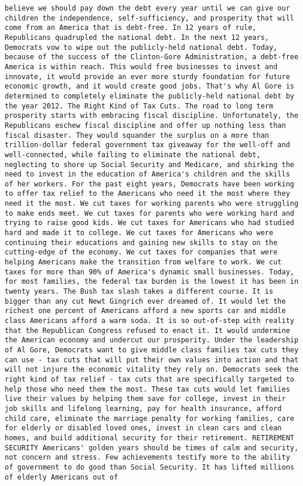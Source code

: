 \documentclass[
]{article}
\begin{document}
\begin{verbatim}
believe we should pay down the debt every year until we can give our children the independence, self-sufficiency, and prosperity that will come from an America that is debt-free. In 12 years of rule, Republicans quadrupled the national debt. In the next 12 years, Democrats vow to wipe out the publicly-held national debt. Today, because of the success of the Clinton-Gore Administration, a debt-free America is within reach. This would free businesses to invest and innovate, it would provide an ever more sturdy foundation for future economic growth, and it would create good jobs. That's why Al Gore is determined to completely eliminate the publicly-held national debt by the year 2012. The Right Kind of Tax Cuts. The road to long term prosperity starts with embracing fiscal discipline. Unfortunately, the Republicans eschew fiscal discipline and offer up nothing less than fiscal disaster. They would squander the surplus on a more than trillion-dollar federal government tax giveaway for the well-off and well-connected, while failing to eliminate the national debt, neglecting to shore up Social Security and Medicare, and shirking the need to invest in the education of America's children and the skills of her workers. For the past eight years, Democrats have been working to offer tax relief to the Americans who need it the most where they need it the most. We cut taxes for working parents who were struggling to make ends meet. We cut taxes for parents who were working hard and trying to raise good kids. We cut taxes for Americans who had studied hard and made it to college. We cut taxes for Americans who were continuing their educations and gaining new skills to stay on the cutting-edge of the economy. We cut taxes for companies that were helping Americans make the transition from welfare to work. We cut taxes for more than 90% of America's dynamic small businesses. Today, for most families, the federal tax burden is the lowest it has been in twenty years. The Bush tax slash takes a different course. It is bigger than any cut Newt Gingrich ever dreamed of. It would let the richest one percent of Americans afford a new sports car and middle class Americans afford a warm soda. It is so out-of-step with reality that the Republican Congress refused to enact it. It would undermine the American economy and undercut our prosperity. Under the leadership of Al Gore, Democrats want to give middle class families tax cuts they can use - tax cuts that will put their own values into action and that will not injure the economic vitality they rely on. Democrats seek the right kind of tax relief - tax cuts that are specifically targeted to help those who need them the most. These tax cuts would let families live their values by helping them save for college, invest in their job skills and lifelong learning, pay for health insurance, afford child care, eliminate the marriage penalty for working families, care for elderly or disabled loved ones, invest in clean cars and clean homes, and build additional security for their retirement. RETIREMENT SECURITY Americans' golden years should be times of calm and security, not concern and stress. Few achievements testify more to the ability of government to do good than Social Security. It has lifted millions of elderly Americans out of 
\end{verbatim}
\end{document}
